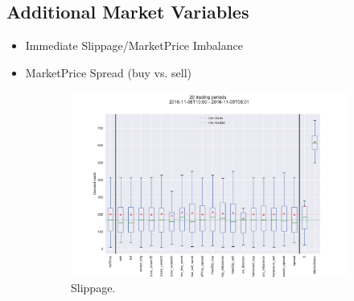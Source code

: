 \subsection{Additional Market Variables}
\label{chap:exp:additionalmarketvars}
\begin{itemize}
\item Immediate Slippage/MarketPrice Imbalance
\item MarketPrice Spread (buy vs. sell)
\end{itemize}




\begin{figure}[ht]
	\centering
	
	\begin{subfigure}[b]{0.6\textwidth}
        		\centering
        		\includegraphics[width=\textwidth]{content/drawings/slippage_additionalMarketVars}
        		\caption{Slippage.}
		\label{fig:eval:additionalMarketVariables:plot}
    	\end{subfigure}%
	\begin{subfigure}[b]{0.25\textwidth}
        		\centering
\end{subfigure}
\end{figure}
